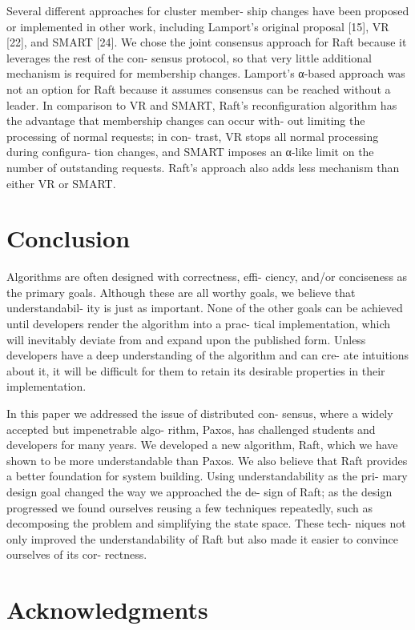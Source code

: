 \documentclass[journal]{IEEEtran}
\begin{document}
Several different approaches for cluster member- ship changes have been proposed or implemented in other work, including Lamport’s original proposal [15], VR [22], and SMART [24]. We chose the joint consensus approach for Raft because it leverages the rest of the con- sensus protocol, so that very little additional mechanism is required for membership changes. Lamport’s α-based approach was not an option for Raft because it assumes consensus can be reached without a leader. In comparison to VR and SMART, Raft’s reconfiguration algorithm has the advantage that membership changes can occur with- out limiting the processing of normal requests; in con- trast, VR stops all normal processing during configura- tion changes, and SMART imposes an α-like limit on the number of outstanding requests. Raft’s approach also adds less mechanism than either VR or SMART.

\section{Conclusion}


Algorithms are often designed with correctness, effi- ciency, and/or conciseness as the primary goals. Although these are all worthy goals, we believe that understandabil- ity is just as important. None of the other goals can be achieved until developers render the algorithm into a prac- tical implementation, which will inevitably deviate from and expand upon the published form. Unless developers have a deep understanding of the algorithm and can cre- ate intuitions about it, it will be difficult for them to retain its desirable properties in their implementation.

In this paper we addressed the issue of distributed con- sensus, where a widely accepted but impenetrable algo- rithm, Paxos, has challenged students and developers for many years. We developed a new algorithm, Raft, which we have shown to be more understandable than Paxos. We also believe that Raft provides a better foundation for system building. Using understandability as the pri- mary design goal changed the way we approached the de- sign of Raft; as the design progressed we found ourselves reusing a few techniques repeatedly, such as decomposing the problem and simplifying the state space. These tech- niques not only improved the understandability of Raft but also made it easier to convince ourselves of its cor- rectness.

\section{Acknowledgments}
\end{document}
